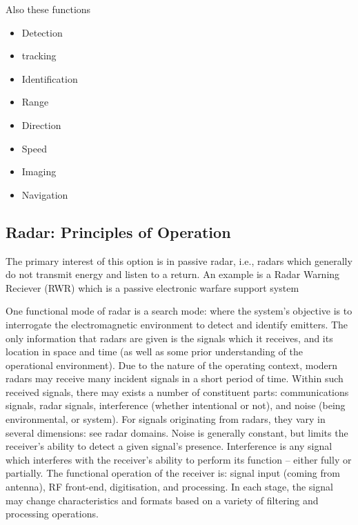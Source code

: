 Also these functions 
\begin{itemize}
    \item Detection
    \item tracking
    \item Identification
    \item Range
    \item Direction
    \item Speed
    \item Imaging
    \item Navigation
\end{itemize}


\subsection{Radar: Principles of Operation}

The primary interest of this option is in passive radar, i.e., radars which generally do not transmit energy and listen to a return. An example is a Radar Warning Reciever (RWR) which is a passive electronic warfare support system \cite{avionics_department_electronic_2013}

One functional mode of radar is a search mode: where the system’s objective is to interrogate the electromagnetic environment to detect and identify emitters. The only information that radars are given is the signals which it receives, and its location in space and time (as well as some prior understanding of the operational environment). Due to the nature of the operating context, modern radars may receive many incident signals in a short period of time. Within such received signals, there may exists a number of constituent parts: communications signals, radar signals, interference (whether intentional or not), and noise (being environmental, or system). For signals originating from radars, they vary in several dimensions: see radar domains. Noise is generally constant, but limits the receiver’s ability to detect a given signal’s presence. Interference is any signal which interferes with the receiver’s ability to perform its function – either fully or partially. The functional operation of the receiver is: signal input (coming from antenna), RF front-end, digitisation, and processing. In each stage, the signal may change characteristics and formats based on a variety of filtering and processing operations.  

